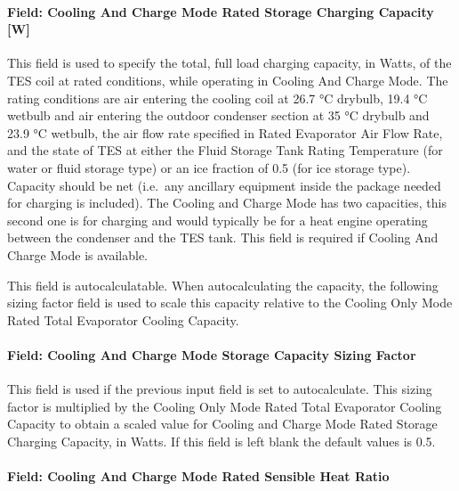 \paragraph{Field: Cooling And Charge Mode Rated Storage Charging Capacity {[}W{]}}\label{field-cooling-and-charge-mode-rated-storage-charging-capacity-w}

This field is used to specify the total, full load charging capacity, in Watts, of the TES coil at rated conditions, while operating in Cooling And Charge Mode. The rating conditions are air entering the cooling coil at 26.7 °C drybulb, 19.4 °C wetbulb and air entering the outdoor condenser section at 35 °C drybulb and 23.9 °C wetbulb, the air flow rate specified in Rated Evaporator Air Flow Rate, and the state of TES at either the Fluid Storage Tank Rating Temperature (for water or fluid storage type) or an ice fraction of 0.5 (for ice storage type). Capacity should be net (i.e.~any ancillary equipment inside the package needed for charging is included). The Cooling and Charge Mode has two capacities, this second one is for charging and would typically be for a heat engine operating between the condenser and the TES tank. This field is required if Cooling And Charge Mode is available.

This field is autocalculatable. When autocalculating the capacity, the following sizing factor field is used to scale this capacity relative to the Cooling Only Mode Rated Total Evaporator Cooling Capacity.

\paragraph{Field: Cooling And Charge Mode Storage Capacity Sizing Factor}\label{field-cooling-and-charge-mode-storage-capacity-sizing-factor}

This field is used if the previous input field is set to autocalculate. This sizing factor is multiplied by the Cooling Only Mode Rated Total Evaporator Cooling Capacity to obtain a scaled value for Cooling and Charge Mode Rated Storage Charging Capacity, in Watts. If this field is left blank the default values is 0.5.

\paragraph{Field: Cooling And Charge Mode Rated Sensible Heat Ratio}\label{field-cooling-and-charge-mode-rated-sensible-heat-ratio}

